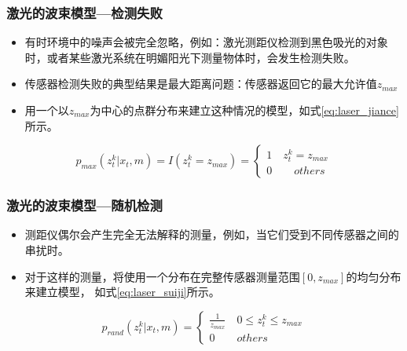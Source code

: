 \begin{frame}
  \frametitle{激光的波束模型---检测失败}
  \begin{itemize}
    \item 有时环境中的噪声会被完全忽略，例如：{\color{red}激光测距仪检测到黑色吸光的对象时，或者某些激光系统在明媚阳光下测量物体时，会发生检测失败}。
    \item 传感器检测失败的典型结果是最大距离问题：传感器返回它的最大允许值$z_{max}$
    \item 用一个以$z_{max}$为中心的点群分布来建立这种情况的模型，如式\ref{eq:laser_jiance}所示。
  \end{itemize}

  \begin{equation}
    p_{max}(z_t^k | x_t, m) = I(z_t^{k}=z_{max}) = 
    \begin{cases}
      1 \quad  z_t^{k} = z_{max}\\
      0 \qquad  others
    \end{cases}
    \label{eq:laser_jiance}
  \end{equation}
\end{frame}

\begin{frame}
  \frametitle{激光的波束模型---随机检测}
  \begin{itemize}
    \item 测距仪偶尔会产生完全无法解释的测量，例如，{\color{red}当它们受到不同传感器之间的串扰时}。
    \item 对于这样的测量，将使用一个分布在完整传感器测量范围$[0, z_{max}]$的均匀分布来建立模型， 如式\ref{eq:laser_suiji}所示。
  \end{itemize}

  \begin{equation}
    p_{rand}(z_t^k | x_t, m) = 
    \begin{cases}
      \frac{1}{z_{max}} \quad  0 \leq z_t^k \leq z_{max}\\
      0 \qquad  others
    \end{cases}
    \label{eq:laser_suiji}
  \end{equation}
\end{frame}

